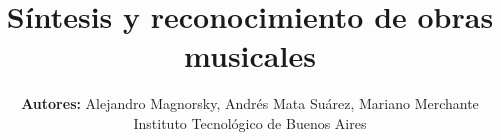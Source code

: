 \documentclass[journal, monochrome]{IEEEtran}
\begin{document}
%
\title{Síntesis y reconocimiento de obras musicales}
%
%
%

\author{\textbf{Autores:} Alejandro Magnorsky, Andrés Mata Suárez, Mariano Merchante \\[5px]
        Instituto Tecnológico de Buenos Aires}
        
% 
%



% 




\end{document}
